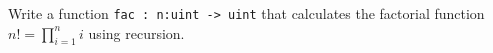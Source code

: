 Write a function \lstinline{fac : n:uint -> uint} that calculates the factorial function $n! = \prod_{i=1}^ni$ using recursion.

